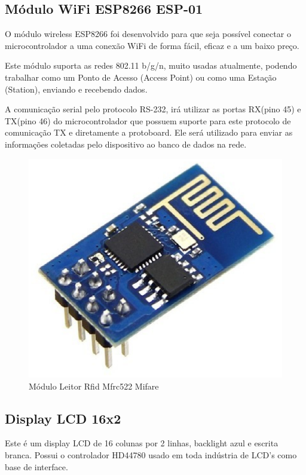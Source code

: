 \subsection{Módulo WiFi ESP8266 ESP-01}
O módulo wireless ESP8266 foi desenvolvido para que seja possível conectar o microcontrolador a uma conexão WiFi de forma fácil, eficaz e a um baixo preço.

Este módulo suporta as redes 802.11 b/g/n, muito usadas atualmente, podendo trabalhar como um Ponto de Acesso (Access Point) ou como uma Estação (Station), enviando e recebendo dados.

A comunicação serial pelo protocolo RS-232, irá utilizar as portas RX(pino 45) e TX(pino 46) do microcontrolador que possuem suporte para este protocolo de comunicação TX e diretamente a protoboard. Ele será utilizado para enviar as informações coletadas pelo dispositivo ao banco de dados na rede.
\pagebreak

\begin{figure}[!ht]
  \centering
  \includegraphics[keepaspectratio=true,scale=0.5]{figuras/wifi.eps}
  \caption{Módulo Leitor Rfid Mfrc522 Mifare}
\end{figure}


\subsection{Display LCD 16x2}
Este é um display LCD de 16 colunas por 2 linhas, backlight azul e escrita branca. Possui o controlador HD44780 usado em toda indústria de LCD's como base de interface.

